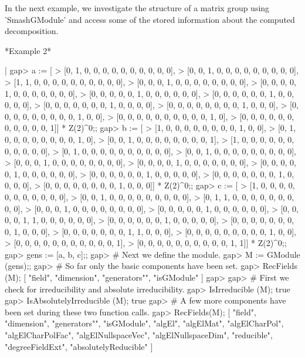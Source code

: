 In the next example, we investigate the structure of a matrix group using
'SmashGModule' and access  some    of the stored information   about  the
computed decomposition.

*Example 2*

|   gap> a := [
   > [0, 1, 0, 0, 0, 0, 0, 0, 0, 0, 0, 0],
   > [0, 0, 1, 0, 0, 0, 0, 0, 0, 0, 0, 0],
   > [1, 1, 0, 0, 0, 0, 0, 0, 0, 0, 0, 0],
   > [0, 0, 0, 1, 0, 0, 0, 0, 0, 0, 0, 0],
   > [0, 0, 0, 0, 1, 0, 0, 0, 0, 0, 0, 0],
   > [0, 0, 0, 0, 0, 1, 0, 0, 0, 0, 0, 0],
   > [0, 0, 0, 0, 0, 0, 1, 0, 0, 0, 0, 0],
   > [0, 0, 0, 0, 0, 0, 0, 1, 0, 0, 0, 0],
   > [0, 0, 0, 0, 0, 0, 0, 0, 1, 0, 0, 0],
   > [0, 0, 0, 0, 0, 0, 0, 0, 0, 1, 0, 0],
   > [0, 0, 0, 0, 0, 0, 0, 0, 0, 0, 1, 0],
   > [0, 0, 0, 0, 0, 0, 0, 0, 0, 0, 0, 1]] * Z(2)^0;;
   gap> b := [
   > [1, 0, 0, 0, 0, 0, 0, 0, 0, 1, 0, 0],
   > [0, 1, 0, 0, 0, 0, 0, 0, 0, 0, 1, 0],
   > [0, 0, 1, 0, 0, 0, 0, 0, 0, 0, 0, 1],
   > [1, 0, 0, 0, 0, 0, 0, 0, 0, 0, 0, 0],
   > [0, 1, 0, 0, 0, 0, 0, 0, 0, 0, 0, 0],
   > [0, 0, 1, 0, 0, 0, 0, 0, 0, 0, 0, 0],
   > [0, 0, 0, 1, 0, 0, 0, 0, 0, 0, 0, 0],
   > [0, 0, 0, 0, 1, 0, 0, 0, 0, 0, 0, 0],
   > [0, 0, 0, 0, 0, 1, 0, 0, 0, 0, 0, 0],
   > [0, 0, 0, 0, 0, 0, 1, 0, 0, 0, 0, 0],
   > [0, 0, 0, 0, 0, 0, 0, 1, 0, 0, 0, 0],
   > [0, 0, 0, 0, 0, 0, 0, 0, 1, 0, 0, 0]] * Z(2)^0;;
   gap> c := [
   > [1, 0, 0, 0, 0, 0, 0, 0, 0, 0, 0, 0],
   > [0, 0, 1, 0, 0, 0, 0, 0, 0, 0, 0, 0],
   > [0, 1, 1, 0, 0, 0, 0, 0, 0, 0, 0, 0],
   > [0, 0, 0, 1, 0, 0, 0, 0, 0, 0, 0, 0],
   > [0, 0, 0, 0, 0, 1, 0, 0, 0, 0, 0, 0],
   > [0, 0, 0, 0, 1, 1, 0, 0, 0, 0, 0, 0],
   > [0, 0, 0, 0, 0, 0, 1, 0, 0, 0, 0, 0],
   > [0, 0, 0, 0, 0, 0, 0, 0, 1, 0, 0, 0],
   > [0, 0, 0, 0, 0, 0, 0, 1, 1, 0, 0, 0],
   > [0, 0, 0, 0, 0, 0, 0, 0, 0, 1, 0, 0],
   > [0, 0, 0, 0, 0, 0, 0, 0, 0, 0, 0, 1],
   > [0, 0, 0, 0, 0, 0, 0, 0, 0, 0, 1, 1]] * Z(2)^0;;
   gap> gens := [a, b, c];;
   gap> # Next we define the module.
   gap> M := GModule (gens);;
   gap> # So far only the basic components have been set.
   gap> RecFields (M);
   [ "field", "dimension", "generators"", "isGModule" ]
   gap> 
   gap> # First we check for irreducibility and absolute irreducibility.
   gap> IsIrreducible (M);
   true
   gap> IsAbsolutelyIrreducible (M);
   true
   gap> # A few more components have been set during these two function calls.
   gap> RecFields(M);
   [ "field", "dimension", "generators"", "isGModule", "algEl", "algElMat", 
     "algElCharPol", "algElCharPolFac", "algElNullspaceVec",
     "algElNullspaceDim",
     "reducible", "degreeFieldExt", "absolutelyReducible" ]
